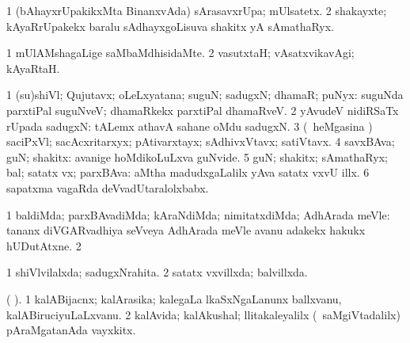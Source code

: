 {{{{{{{{\bentry 
{} 
\gl{\nA}
\expl{}
\bmng
\bnum
\num{1} (bAhayxrUpakikxMta BinanxvAda) sArasavxrUpa; mUlsatetx. 
\num{2} shakayxte; kAyaRrUpakekx baralu sAdhayxgoLisuva shakitx yA sAmathaRyx. 
\enum
\emng
\eentry

\bentry 
{} 
\gl{\kirxvi}
\expl{}
\bmng
\bnum
\num{1} mUlAMshagaLige saMbaMdhisidaMte. 
\num{2} vasutxtaH; vAsatxvikavAgi; kAyaRtaH. 
\enum
\emng
\eentry

\bentry
{} 
\gl{\nA}
\expl{}
\bmng
\bnum
\num{1} (su)shiVl; Qujutavx; oLeLxyatana; suguN; sadugxN; dhamaR; puNyx:  suguNda parxtiPal suguNveV; dhamaRkekx parxtiPal dhamaRveV. 
\num{2} yAvudeV nidiRSaTx rUpada sadugxN:  tALemx athavA sahane oMdu sadugxN. 
\num{3} (\kanmu\ heMgasina \vi) saciPxVl; sacAcxritarxyx; pAtivarxtayx; sAdhivxVtavx; satiVtavx. 
\num{4} savxBAva; guN; shakitx:  avanige hoMdikoLuLxva guNvide. 
\num{5} guN; shakitx; sAmathaRyx; bal; satatx vx; parxBAva:  aMtha madudxgaLalilx yAva satatx vxvU illx. 
\num{6} sapatxma vagaRda deVvadUtaralolxbabx. 
\enum
\emng

\noindent 
\gl{\pagu}
\expl{}
\bmng
\bnum
\num{1}  baldiMda; parxBAvadiMda; kAraNdiMda; nimitatxdiMda; AdhArada meVle:  tananx diVGARvadhiya seVveya AdhArada meVle avanu adakekx hakukx hUDutAtxne. 
\num{2}  
\enum
\emng
\eentry

\bentry 
{} 
\gl{\gu}
\expl{}
\bmng
\bnum
\num{1} shiVlvilalxda; sadugxNrahita. 
\num{2} satatx vxvillxda; balvillxda. 
\enum
\emng
\eentry

\bentry 
{} 
\gl{\gu}
\expl{}
\bmng
\emng
\eentry

\bentry 
{} 
\gl{\nA}
\expl{}
\bmng
\emng
\eentry
 
\bentry
{} 
\gl{\nA}(\bava {}
).  \bmng
\bnum
\num{1} kalABijacnx; kalArasika; kalegaLa lkaSxNgaLanunx ballxvanu, kalABiruciyuLaLxvanu. 
\num{2} kalAvida; kalAkushal; llitakaleyalilx (\kanmu\ saMgiVtadalilx) pAraMgatanAda vayxkitx. 
\enum
\emng
\eentry

}}}}}}}}
